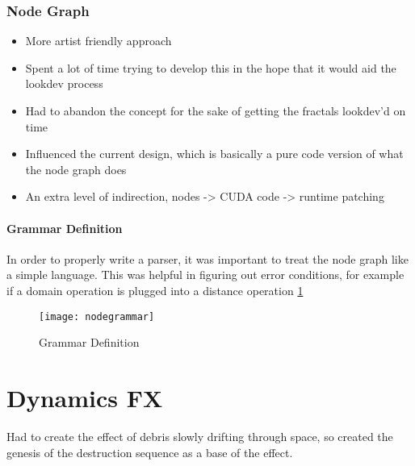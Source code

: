 \documentclass[11pt,a4paper,final,notitlepage]{report}
\begin{document}
\subsection{Node Graph}

\begin{itemize}
	\item More artist friendly approach
	\item Spent a lot of time trying to develop this in the hope that it would aid the lookdev process
	\item Had to abandon the concept for the sake of getting the fractals lookdev'd on time
	\item Influenced the current design, which is basically a pure code version of what the node graph does
	\item An extra level of indirection, nodes -> CUDA code -> runtime patching
\end{itemize}

\subsubsection{Grammar Definition}
In order to properly write a parser, it was important to treat the node graph like a simple language. This was helpful in figuring out error conditions, for example if a domain operation is plugged into a distance operation \ref{fig:grammar}

\begin{figure}[h!]
	\texttt{[image: nodegrammar]}
	\caption{Grammar Definition}
	\label{fig:grammar}
\end{figure}

\chapter{Dynamics FX}

Had to create the effect of debris slowly drifting through space, so created the genesis of the destruction sequence as a base of the effect.
\end{document}
